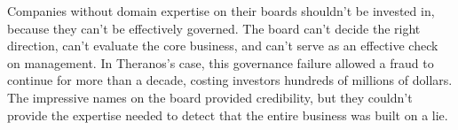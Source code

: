 Companies without domain expertise on their boards shouldn't be invested in, because they can't be effectively governed. The board can't decide the right direction, can't evaluate the core business, and can't serve as an effective check on management. In Theranos's case, this governance failure allowed a fraud to continue for more than a decade, costing investors hundreds of millions of dollars. The impressive names on the board provided credibility, but they couldn't provide the expertise needed to detect that the entire business was built on a lie.
